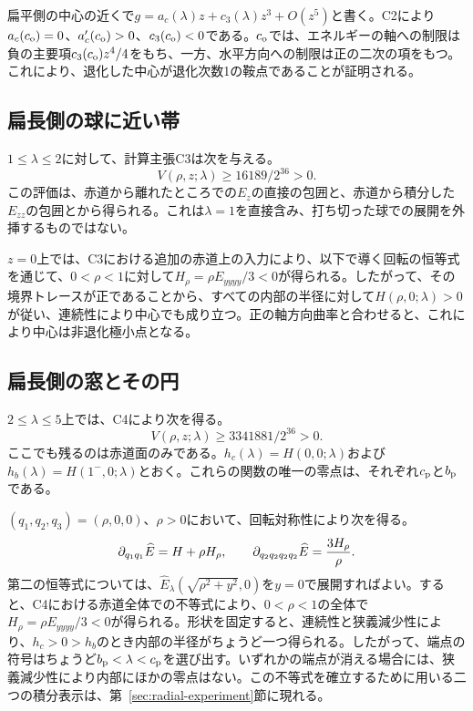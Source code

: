 扁平側の中心の近くで$g=a_c(\lambda)z+c_3(\lambda)z^3+O(z^5)$と書く。C2により$a_c(c_{\mathrm o})=0$、$a_c'(c_{\mathrm o})>0$、$c_3(c_{\mathrm o})<0$である。$c_{\mathrm o}$では、エネルギーの軸への制限は負の主要項$c_3(c_{\mathrm o})z^4/4$をもち、一方、水平方向への制限は正の二次の項をもつ。これにより、退化した中心が退化次数1の鞍点であることが証明される。

\subsection{扁長側の球に近い帯}
$1\le\lambda\le2$に対して、計算主張C3は次を与える。
\begin{equation}\label{eq:near_V}
 V(\rho,z;\lambda)\ge16189/2^{36}>0.
\end{equation}
この評価は、赤道から離れたところでの$E_z$の直接の包囲と、赤道から積分した$E_{zz}$の包囲とから得られる。これは$\lambda=1$を直接含み、打ち切った球での展開を外挿するものではない。

$z=0$上では、C3における追加の赤道上の入力により、以下で導く回転の恒等式を通じて、$0<\rho<1$に対して$H_\rho=\rho E_{yyyy}/3<0$が得られる。したがって、その境界トレースが正であることから、すべての内部の半径に対して$H(\rho,0;\lambda)>0$が従い、連続性により中心でも成り立つ。正の軸方向曲率と合わせると、これにより中心は非退化極小点となる。

\subsection{扁長側の窓とその円}
$2\le\lambda\le5$上では、C4により次を得る。
\begin{equation}\label{eq:window_V}
 V(\rho,z;\lambda)\ge3341881/2^{36}>0.
\end{equation}
ここでも残るのは赤道面のみである。$h_c(\lambda)=H(0,0;\lambda)$および$h_b(\lambda)=H(1^-,0;\lambda)$とおく。これらの関数の唯一の零点は、それぞれ$c_{\mathrm p}$と$b_{\mathrm p}$である。

$(q_1,q_2,q_3)=(\rho,0,0)$、$\rho>0$において、回転対称性により次を得る。
\begin{equation}\label{eq:fourth_derivative}
 \partial_{q_1q_1}\widehat E=H+\rho H_\rho,\qquad
 \partial_{q_2q_2q_2q_2}\widehat E=\frac{3H_\rho}{\rho}.
\end{equation}
第二の恒等式については、$\widehat E_\lambda(\sqrt{\rho^2+y^2},0)$を$y=0$で展開すればよい。すると、C4における赤道全体での不等式により、$0<\rho<1$の全体で$H_\rho=\rho E_{yyyy}/3<0$が得られる。形状を固定すると、連続性と狭義減少性により、$h_c>0>h_b$のとき内部の半径がちょうど一つ得られる。したがって、端点の符号はちょうど$b_{\mathrm p}<\lambda<c_{\mathrm p}$を選び出す。いずれかの端点が消える場合には、狭義減少性により内部にほかの零点はない。この不等式を確立するために用いる二つの積分表示は、第~\ref{sec:radial-experiment}節に現れる。

